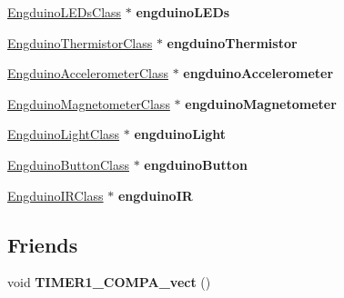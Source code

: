 \begin{DoxyCompactItemize}
\item 
\hypertarget{class_engduino_protocol_class_ae06ac1a1ff252feb2ae473c6c4fe95a3}{}\hyperlink{class_engduino_l_e_ds_class}{Engduino\+L\+E\+Ds\+Class} $\ast$ {\bfseries engduino\+L\+E\+Ds}\label{class_engduino_protocol_class_ae06ac1a1ff252feb2ae473c6c4fe95a3}

\item 
\hypertarget{class_engduino_protocol_class_a0584004462e7501ca49b2dc4be77508b}{}\hyperlink{class_engduino_thermistor_class}{Engduino\+Thermistor\+Class} $\ast$ {\bfseries engduino\+Thermistor}\label{class_engduino_protocol_class_a0584004462e7501ca49b2dc4be77508b}

\item 
\hypertarget{class_engduino_protocol_class_a67132cca370b49bdf0815b42748f4841}{}\hyperlink{class_engduino_accelerometer_class}{Engduino\+Accelerometer\+Class} $\ast$ {\bfseries engduino\+Accelerometer}\label{class_engduino_protocol_class_a67132cca370b49bdf0815b42748f4841}

\item 
\hypertarget{class_engduino_protocol_class_ae0494dfe5a16238fd4ec2689880a7408}{}\hyperlink{class_engduino_magnetometer_class}{Engduino\+Magnetometer\+Class} $\ast$ {\bfseries engduino\+Magnetometer}\label{class_engduino_protocol_class_ae0494dfe5a16238fd4ec2689880a7408}

\item 
\hypertarget{class_engduino_protocol_class_a7d5cd7d8c682cdaab633ac47881531e5}{}\hyperlink{class_engduino_light_class}{Engduino\+Light\+Class} $\ast$ {\bfseries engduino\+Light}\label{class_engduino_protocol_class_a7d5cd7d8c682cdaab633ac47881531e5}

\item 
\hypertarget{class_engduino_protocol_class_aa934e66345dfaeddab03f3b20bc71fac}{}\hyperlink{class_engduino_button_class}{Engduino\+Button\+Class} $\ast$ {\bfseries engduino\+Button}\label{class_engduino_protocol_class_aa934e66345dfaeddab03f3b20bc71fac}

\item 
\hypertarget{class_engduino_protocol_class_a3e8e517b0ed2b39ec93907d759e25ebe}{}\hyperlink{class_engduino_i_r_class}{Engduino\+I\+R\+Class} $\ast$ {\bfseries engduino\+I\+R}\label{class_engduino_protocol_class_a3e8e517b0ed2b39ec93907d759e25ebe}

\end{DoxyCompactItemize}
\subsection*{Friends}
\begin{DoxyCompactItemize}
\item 
\hypertarget{class_engduino_protocol_class_a01641f91ca3e348b0080eeaa767d626b}{}void {\bfseries T\+I\+M\+E\+R1\+\_\+\+C\+O\+M\+P\+A\+\_\+vect} ()\label{class_engduino_protocol_class_a01641f91ca3e348b0080eeaa767d626b}

\end{DoxyCompactItemize}


